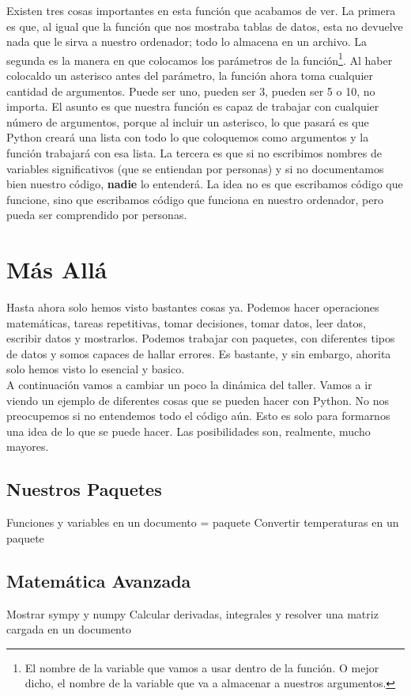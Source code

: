 \documentclass[10pt,letterpaper]{article}
\begin{document}
Existen tres cosas importantes en esta funci\'on que acabamos de ver. La primera es que, al igual que la funci\'on que nos mostraba tablas de datos, esta no devuelve nada que le sirva a nuestro ordenador; todo lo almacena en un archivo. La segunda es la manera en que colocamos los par\'ametros de la funci\'on\footnote{El nombre de la variable que vamos a usar dentro de la funci\'on. O mejor dicho, el nombre de la variable que va a almacenar a nuestros argumentos.}. Al haber colocaldo un asterisco antes del par\'ametro, la funci\'on ahora toma cualquier cantidad de argumentos. Puede ser uno, pueden ser 3, pueden ser 5 o 10, no importa. El asunto es que nuestra funci\'on es capaz de trabajar con cualquier n\'umero de argumentos, porque al incluir un asterisco, lo que pasar\'a es que Python crear\'a una lista con todo lo que coloquemos como argumentos y la funci\'on trabajar\'a con esa lista. La tercera es que si no escribimos nombres de variables significativos (que se entiendan por personas) y si no documentamos bien nuestro c\'odigo, \textbf{nadie} lo entender\'a. La idea no es que escribamos c\'odigo que funcione, sino que escribamos c\'odigo que funciona en nuestro ordenador, pero pueda ser comprendido por personas.

\section{M\'as All\'a}
Hasta ahora solo hemos visto bastantes cosas ya. Podemos hacer operaciones matem\'aticas, tareas repetitivas, tomar decisiones, tomar datos, leer datos, escribir datos y mostrarlos. Podemos trabajar con paquetes, con diferentes tipos de datos y somos capaces de hallar errores. Es bastante, y sin embargo, ahorita solo hemos visto lo esencial y basico.\\

A continuaci\'on vamos a cambiar un poco la din\'amica del taller. Vamos a ir viendo un ejemplo de diferentes cosas que se pueden hacer con Python. No nos preocupemos si no entendemos todo el c\'odigo a\'un. Esto es solo para formarnos una idea de lo que se puede hacer. Las posibilidades son, realmente, mucho mayores.

\subsection{Nuestros Paquetes}
Funciones y variables en un documento = paquete
Convertir temperaturas en un paquete
\subsection{Matem\'atica Avanzada}
Mostrar sympy y numpy
Calcular derivadas, integrales y resolver una matriz cargada en un documento
\end{document}
